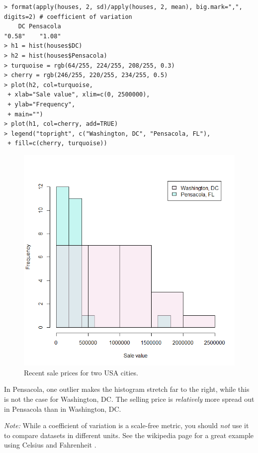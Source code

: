 \documentclass{report}
\begin{document}
			\begin{verbatim}
> format(apply(houses, 2, sd)/apply(houses, 2, mean), big.mark=",", digits=2) # coefficient of variation
    DC Pensacola 
"0.58"    "1.08"
> h1 = hist(houses$DC)
> h2 = hist(houses$Pensacola)
> turquoise = rgb(64/255, 224/255, 208/255, 0.3)
> cherry = rgb(246/255, 220/255, 234/255, 0.5)
> plot(h2, col=turquoise,
 + xlab="Sale value", xlim=c(0, 2500000),
 + ylab="Frequency",
 + main="")
> plot(h1, col=cherry, add=TRUE)
> legend("topright", c("Washington, DC", "Pensacola, FL"), 
 + fill=c(cherry, turquoise))
			\end{verbatim}
			
			\begin{figure}[h]
				\centering
				\includegraphics[width=1.0\textwidth]{houses.png}
				\caption{Recent sale prices for two USA cities.}
				\label{fig:houses}
			\end{figure}
			
			In Pensacola, one outlier makes the histogram stretch far to the right, while this is not the case for Washington, DC. The selling price is \emph{relatively} more spread out in Pensacola than in Washington, DC.
			
			\emph{Note:} While a coefficient of variation is a scale-free metric, you should \emph{not} use it to compare datasets in different units. See the wikipedia page for a great example using Celsius and Fahrenheit \cite{cov}.
			
\end{document}
